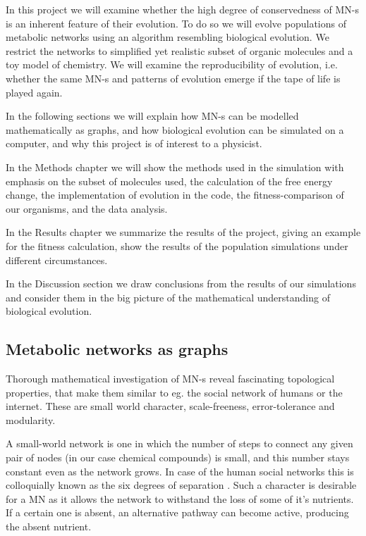 \documentclass[a4paper,12pt]{article}
\begin{document}
	In this project we will examine whether the high degree of conservedness  of MN-s is an inherent feature of their evolution. To do so we will evolve populations of metabolic networks using an algorithm resembling biological evolution. We restrict the networks to simplified yet realistic subset of organic molecules and a toy model of chemistry. We will examine the reproducibility of evolution, i.e. whether the same MN-s and patterns of evolution emerge if the tape of life is played again. 

	In the following sections we will explain how MN-s can be modelled mathematically as graphs, and how biological evolution can be simulated on a computer, and why this project is of interest to a physicist.

	In the Methods chapter we  will show the methods used in the simulation with emphasis on the subset of molecules used, the calculation of the free energy change, the implementation of evolution in the code, the fitness-comparison of our organisms, and the data analysis. 

	In the Results chapter we summarize the results of the project, giving an example for the fitness calculation, show the results of the population simulations under different circumstances.


	In the Discussion section we draw conclusions from the results of our simulations and consider them in the big picture of the mathematical understanding of biological evolution. 

	
	\subsection{Metabolic networks as graphs}
	Thorough mathematical investigation of MN-s reveal fascinating topological properties, that make them similar to eg. the social network of humans or the internet. These are small world character, scale-freeness, error-tolerance \cite{largescale} and modularity.	

	A small-world network \cite{smallworld} is one in which the number of steps to connect any given pair of nodes (in our case chemical compounds) is small, and this number stays constant even as the network grows. In case of the human social networks this is colloquially known as the six degrees of separation \cite{sixdegrees}. Such a character is desirable for a MN as it allows the network to withstand the loss of some of it's nutrients. If a certain one is absent, an alternative pathway can become active, producing the absent nutrient. %
	 
\end{document}
